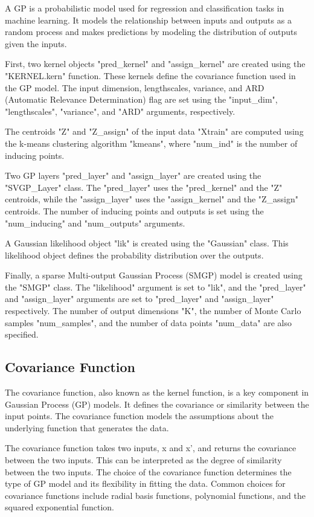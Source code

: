 \documentclass[12pt,a4paper]{report}
\begin{document}
A GP is a probabilistic model used for regression and classification tasks in machine learning. 
It models the relationship between inputs and outputs as a random process and makes predictions by modeling the distribution of outputs given the inputs.

First, two kernel objects "pred\_kernel" and "assign\_kernel" are created using the "KERNEL.kern" function. 
These kernels define the covariance function used in the GP model. 
The input dimension, lengthscales, variance, and ARD (Automatic Relevance Determination) flag are set using the "input\_dim", "lengthscales", "variance", and "ARD" arguments, respectively.

The centroids "Z" and "Z\_assign" of the input data "Xtrain" are computed using the k-means clustering algorithm "kmeans", where "num\_ind" is the number of inducing points.

Two GP layers "pred\_layer" and "assign\_layer" are created using the "SVGP\_Layer" class. 
The "pred\_layer" uses the "pred\_kernel" and the "Z" centroids, while the "assign\_layer" uses the "assign\_kernel" and the "Z\_assign" centroids. 
The number of inducing points and outputs is set using the "num\_inducing" and "num\_outputs" arguments.

A Gaussian likelihood object "lik" is created using the "Gaussian" class. 
This likelihood object defines the probability distribution over the outputs.

Finally, a sparse Multi-output Gaussian Process (SMGP) model is created using the "SMGP" class.
The "likelihood" argument is set to "lik", and the "pred\_layer" and "assign\_layer" arguments are set to "pred\_layer" and "assign\_layer" respectively. 
The number of output dimensions "K", the number of Monte Carlo samples "num\_samples", and the number of data points "num\_data" are also specified.

\subsection{Covariance Function}

The covariance function, also known as the kernel function, is a key component in Gaussian Process (GP) models. 
It defines the covariance or similarity between the input points. 
The covariance function models the assumptions about the underlying function that generates the data.

The covariance function takes two inputs, x and x', and returns the covariance between the two inputs. 
This can be interpreted as the degree of similarity between the two inputs. 
The choice of the covariance function determines the type of GP model and its flexibility in fitting the data. 
Common choices for covariance functions include radial basis functions, polynomial functions, and the squared exponential function.
\end{document}
